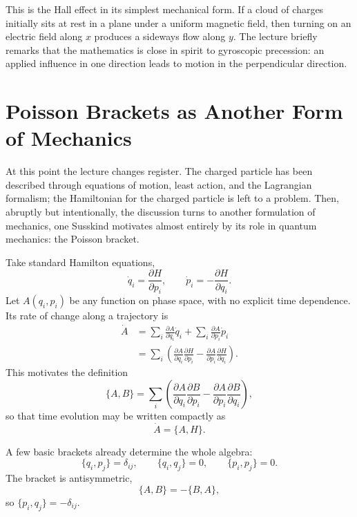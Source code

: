 This is the Hall effect in its simplest mechanical form. If a cloud of charges initially sits at rest in a plane under a uniform magnetic field, then turning on an electric field along \(x\) produces a sideways flow along \(y\). The lecture briefly remarks that the mathematics is close in spirit to gyroscopic precession: an applied influence in one direction leads to motion in the perpendicular direction.

\section{Poisson Brackets as Another Form of Mechanics}

At this point the lecture changes register. The charged particle has been described through equations of motion, least action, and the Lagrangian formalism; the Hamiltonian for the charged particle is left to a problem. Then, abruptly but intentionally, the discussion turns to another formulation of mechanics, one Susskind motivates almost entirely by its role in quantum mechanics: the Poisson bracket.

Take standard Hamilton equations,
\begin{equation}
\dot q_i=\frac{\partial H}{\partial p_i},
\qquad
\dot p_i=-\frac{\partial H}{\partial q_i}.
\end{equation}
Let \(A(q_i,p_i)\) be any function on phase space, with no explicit time dependence. Its rate of change along a trajectory is
\begin{align}
\dot A
&=
\sum_i \frac{\partial A}{\partial q_i}\dot q_i
+
\sum_i \frac{\partial A}{\partial p_i}\dot p_i \\
&=
\sum_i
\left(
\frac{\partial A}{\partial q_i}\frac{\partial H}{\partial p_i}
-
\frac{\partial A}{\partial p_i}\frac{\partial H}{\partial q_i}
\right).
\end{align}
This motivates the definition
\begin{equation}
\{A,B\}
=
\sum_i
\left(
\frac{\partial A}{\partial q_i}\frac{\partial B}{\partial p_i}
-
\frac{\partial A}{\partial p_i}\frac{\partial B}{\partial q_i}
\right),
\end{equation}
so that time evolution may be written compactly as
\begin{equation}
\dot A=\{A,H\}.
\end{equation}

A few basic brackets already determine the whole algebra:
\begin{equation}
\{q_i,p_j\}=\delta_{ij},
\qquad
\{q_i,q_j\}=0,
\qquad
\{p_i,p_j\}=0.
\end{equation}
The bracket is antisymmetric,
\begin{equation}
\{A,B\}=-\{B,A\},
\end{equation}
so \(\{p_i,q_j\}=-\delta_{ij}\).

